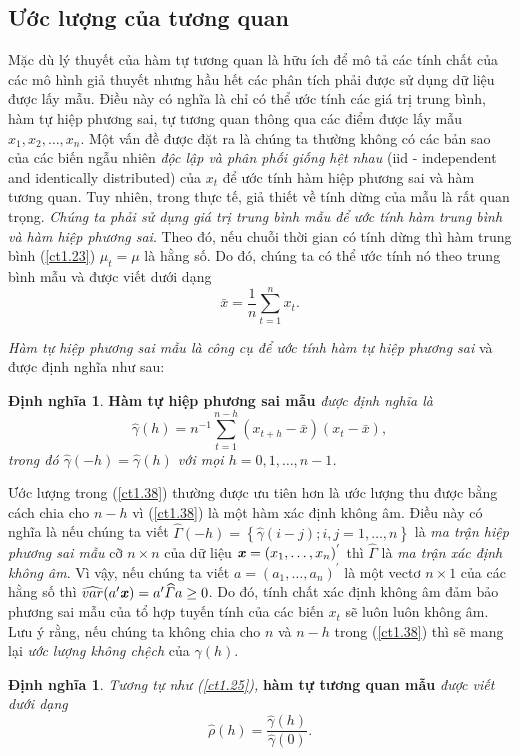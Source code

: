 \documentclass[12pt, a4paper,oneside]{book}
\theoremstyle{definition}
\newtheorem{dn}[theo]{Định nghĩa}
\begin{document}
\subsection{Ước lượng của tương quan}
Mặc dù lý thuyết của hàm tự tương quan là hữu ích để mô tả các tính chất của các mô hình giả thuyết nhưng hầu hết các phân tích phải được sử dụng dữ liệu được lấy mẫu. Điều này có nghĩa là chỉ có thể ước tính các giá trị trung bình, hàm tự hiệp phương sai, tự tương quan thông qua các điểm được lấy mẫu $x_1, x_2, \dots, x_n$. Một vấn đề được đặt ra là chúng ta thường không có các bản sao của các biến ngẫu nhiên \textit{độc lập và phân phối giống hệt nhau} (iid - independent and identically distributed) của $x_t$ để ước tính hàm hiệp phương sai và hàm tương quan. Tuy nhiên, trong thực tế, giả thiết về tính dừng của mẫu là rất quan trọng. \textit{Chúng ta phải sử dụng giá trị trung bình mẫu để ước tính hàm trung bình và hàm hiệp phương sai}. Theo đó, nếu chuỗi thời gian có tính dừng thì hàm trung bình (\ref{ct1.23}) $\mu_t=\mu$ là hằng số. Do đó, chúng ta có thể ước tính nó theo trung bình mẫu và được viết dưới dạng
\begin{equation}
\bar{x} = \frac{1}{n}\sum _ {t = 1 } ^ { n } x_{t}. \label{ct1.37}
\end{equation}

\textit{Hàm tự hiệp phương sai mẫu là công cụ để ước tính hàm tự hiệp phương sai} và được định nghĩa như sau:
\begin{dn}\cite{1} \textbf{Hàm tự hiệp phương sai mẫu} \textit{được định nghĩa là 
		\begin{equation}
		\widehat{\gamma}(h) = n^{-1}\sum _ {t = 1 } ^ {n-h} (x_{t+h}-\bar{x})(x_{t}-\bar{x}), \label{ct1.38}
		\end{equation} trong đó $\widehat{\gamma}(-h) = \widehat{\gamma}(h)$ với mọi $h= 0, 1, \dots, n-1$.}
\end{dn}
Ước lượng trong (\ref{ct1.38}) thường được ưu tiên hơn là ước lượng thu được bằng cách chia cho $n - h$ vì (\ref{ct1.38}) là một hàm xác định không âm. Điều này có nghĩa là nếu chúng ta viết $\widehat{\Gamma}(-h) =\left\lbrace \widehat{\gamma}(i-j); i, j=1, \dots, n\right\rbrace$ là \textit{ma trận hiệp phương sai mẫu} cỡ $n \times n$ của dữ liệu $\textbf{\textit{x}} = (x_{1}, \dots, x_{n})^{'}$ thì $\widehat{\Gamma}$ là \textit{ma trận xác định không âm}. Vì vậy, nếu chúng ta viết $a = (a_{1}, \dots, a_{n})^{'}$ là một vectơ $n \times 1$ của các hằng số thì $\widehat{var}(a'\textbf{\textit{x}}) = a'\widehat{\varGamma}a\geq 0$. Do đó, tính chất xác định không âm đảm bảo phương sai mẫu của tổ hợp tuyến tính của các biến $x_{t}$ sẽ luôn luôn không âm. Lưu ý rằng, nếu chúng ta không chia cho $n$ và $n - h$ trong (\ref{ct1.38}) thì sẽ mang lại \textit{ước lượng không chệch} của $\gamma(h)$.
\begin{dn}\cite{1} \textit{Tương tự như (\ref{ct1.25}),} \textbf{hàm tự tương quan mẫu}\textit{ được viết dưới dạng
		\begin{equation}
		\widehat{\rho}(h)=\dfrac{\widehat{\gamma}(h)}{\widehat{\gamma}(0)}. \label{ct1.39}
		\end{equation} }
\end{dn}
\end{document}
